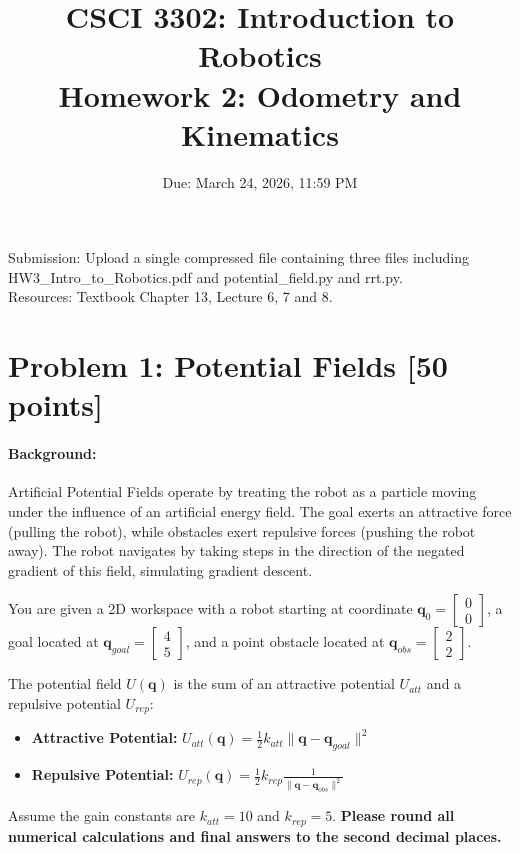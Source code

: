 \documentclass[11pt,letterpaper]{article}
\begin{document}
\title{CSCI 3302: Introduction to Robotics\\Homework 2: Odometry and Kinematics}
\date{Due: March 24, 2026, 11:59 PM}
\maketitle
\noindent
Submission: Upload a single compressed file containing three files including HW3\_Intro\_to\_Robotics.pdf and potential\_field.py and rrt.py.\\
Resources: Textbook Chapter 13, Lecture 6, 7 and 8.\\[0.5em]
\section*{Problem 1: Potential Fields [50 points]}

\paragraph{Background:}
Artificial Potential Fields operate by treating the robot as a particle moving under the influence of an artificial energy field. The goal exerts an attractive force (pulling the robot), while obstacles exert repulsive forces (pushing the robot away). The robot navigates by taking steps in the direction of the negated gradient of this field, simulating gradient descent.


You are given a 2D workspace with a robot starting at coordinate $\mathbf{q}_0 = \begin{bmatrix} 0 \\ 0 \end{bmatrix}$, a goal located at $\mathbf{q}_{goal} = \begin{bmatrix} 4 \\ 5 \end{bmatrix}$, and a point obstacle located at $\mathbf{q}_{obs} = \begin{bmatrix} 2 \\ 2 \end{bmatrix}$.

The potential field $U(\mathbf{q})$ is the sum of an attractive potential $U_{att}$ and a repulsive potential $U_{rep}$:
\begin{itemize}
    \item \textbf{Attractive Potential:} $U_{att}(\mathbf{q}) = \frac{1}{2} k_{att} \|\mathbf{q} - \mathbf{q}_{goal}\|^2$
    \item \textbf{Repulsive Potential:} $U_{rep}(\mathbf{q}) = \frac{1}{2} k_{rep} \frac{1}{\|\mathbf{q} - \mathbf{q}_{obs}\|^2}$
\end{itemize}
Assume the gain constants are $k_{att} = 10$ and $k_{rep} = 5$. \textbf{Please round all numerical calculations and final answers to the second decimal places.}
\end{document}
